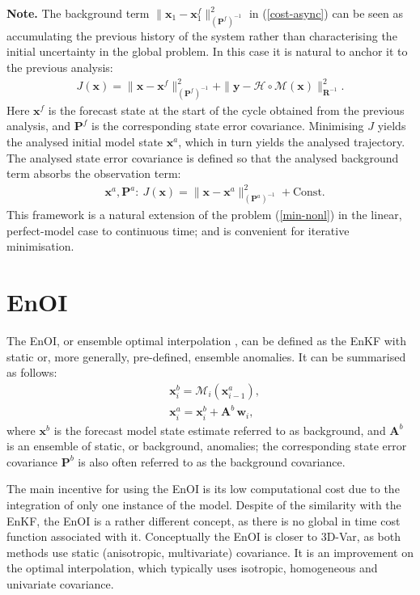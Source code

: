 \documentclass[11pt]{report}
\newcommand{\mb} {\mathbf}
\begin{document}
{
  \setlength{\abovedisplayskip}{2pt}
  \setlength{\belowdisplayskip}{2pt}
  \scriptsize
  {\bf Note.} The background term $\|\mb x_1 - \mb x_1^f\|^2_{(\mb P^f)^{-1}}$ in (\ref{cost-async}) can be seen as accumulating the previous history of the system rather than characterising the initial uncertainty in the global problem.
  In this case it is natural to anchor it to the previous analysis:
  \begin{align}
    J(\mb x) = \|\mb x - \mb x^f\|^2_{(\mb P^f)^{-1}} + \|\mb y - \mathcal H \circ \mathcal M(\mb x)\|^2_{\mb R^{-1}}.
  \end{align}
  Here $\mb x^f$ is the forecast state at the start of the cycle obtained from the previous analysis, and $\mb P^f$ is the corresponding state error covariance.
  Minimising $J$ yields the analysed initial model state $\mb x^a$, which in turn yields the analysed trajectory.
  The analysed state error covariance is defined so that the analysed background term absorbs the observation term:
  \begin{align*}
    &\mb x^a, \mb P^a: \ J(\mb x) = \|\mb x - \mb x^a\|^2_{(\mb P^a)^{-1}} + \mathrm{Const}.
  \end{align*}
  This framework is a natural extension of the problem (\ref{min-nonl}) in the linear, perfect-model case to continuous time; and is convenient for iterative minimisation.\par
}

\section{EnOI}

The EnOI, or ensemble optimal interpolation \citep{eve03a}, can be defined as the EnKF with static or, more generally, pre-defined, ensemble anomalies.
It can be summarised as follows:
\begin{align}
  \label{enoi-for}
  & \mb x^b_i = \mathcal M_i(\mb x^a_{i-1}),\\
  & \mb x^a_i = \mb x^b_i + \mb A^b \, \mb w_i,
\end{align}
where $\mb x^b$ is the forecast model state estimate referred to as background, and $\mb A^b$ is an ensemble of static, or background, anomalies; the corresponding state error covariance $\mb P^b$ is also often referred to as the background covariance.

The main incentive for using the EnOI is its low computational cost due to the integration of only one instance of the model.
Despite of the similarity with the EnKF, the EnOI is a rather different concept, as there is no global in time cost function associated with it.
Conceptually the EnOI is closer to 3D-Var, as both methods use static (anisotropic, multivariate) covariance.
It is an improvement on the optimal interpolation, which typically uses isotropic, homogeneous and univariate covariance.
\end{document}
